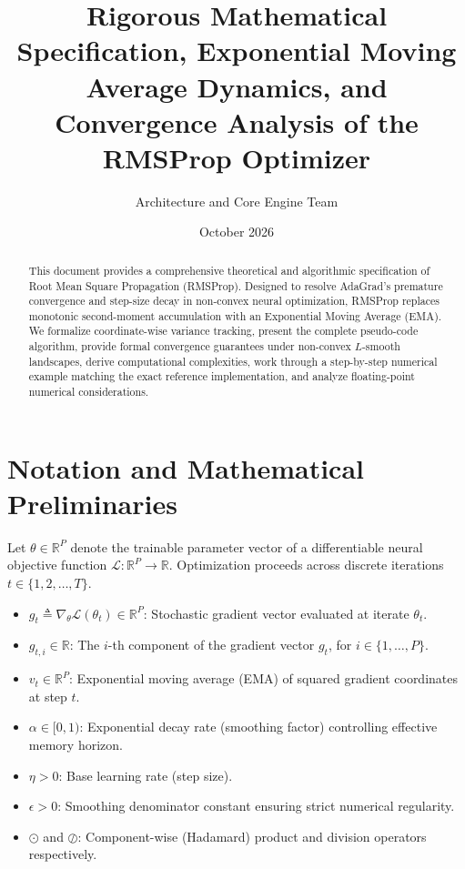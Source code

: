 \documentclass[11pt,a4paper]{article}
\title{\textbf{Rigorous Mathematical Specification, Exponential Moving Average Dynamics, and Convergence Analysis of the RMSProp Optimizer}}
\author{Architecture and Core Engine Team}
\date{October 2026}
\theoremstyle{definition}
\begin{document}
\maketitle

\begin{abstract}
This document provides a comprehensive theoretical and algorithmic specification of Root Mean Square Propagation (RMSProp). Designed to resolve AdaGrad's premature convergence and step-size decay in non-convex neural optimization, RMSProp replaces monotonic second-moment accumulation with an Exponential Moving Average (EMA). We formalize coordinate-wise variance tracking, present the complete pseudo-code algorithm, provide formal convergence guarantees under non-convex $L$-smooth landscapes, derive computational complexities, work through a step-by-step numerical example matching the exact reference implementation, and analyze floating-point numerical considerations.
\end{abstract}

\section{Notation and Mathematical Preliminaries}

Let $\theta \in \mathbb{R}^P$ denote the trainable parameter vector of a differentiable neural objective function $\mathcal{L}: \mathbb{R}^P \to \mathbb{R}$. Optimization proceeds across discrete iterations $t \in \{1, 2, \dots, T\}$.

\begin{itemize}
    \item $g_t \triangleq \nabla_\theta \mathcal{L}(\theta_t) \in \mathbb{R}^P$: Stochastic gradient vector evaluated at iterate $\theta_t$.
    \item $g_{t, i} \in \mathbb{R}$: The $i$-th component of the gradient vector $g_t$, for $i \in \{1, \dots, P\}$.
    \item $v_t \in \mathbb{R}^P$: Exponential moving average (EMA) of squared gradient coordinates at step $t$.
    \item $\alpha \in [0, 1)$: Exponential decay rate (smoothing factor) controlling effective memory horizon.
    \item $\eta > 0$: Base learning rate (step size).
    \item $\epsilon > 0$: Smoothing denominator constant ensuring strict numerical regularity.
    \item $\odot$ and $\oslash$: Component-wise (Hadamard) product and division operators respectively.
\end{itemize}
\end{document}
